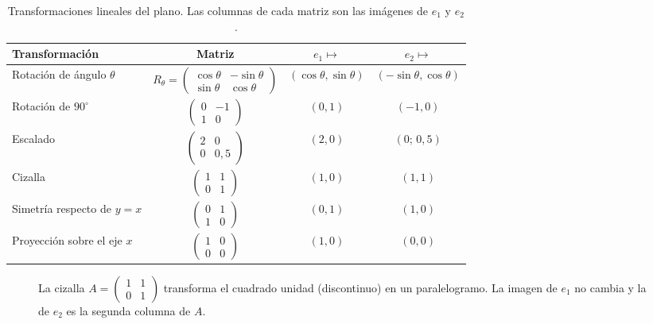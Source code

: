 \begin{table}[h]
\centering\small
\caption{Transformaciones lineales del plano. Las columnas de cada matriz son las imágenes de $e_1$ y $e_2$.}\label{tab:transformaciones}
\begin{tabular}{@{}lccc@{}}
\toprule
Transformación & Matriz & $e_1\mapsto$ & $e_2\mapsto$ \\
\midrule
Rotación de ángulo $\theta$ & $R_\theta=\begin{pmatrix}\cos\theta&-\sin\theta\\ \sin\theta&\cos\theta\end{pmatrix}$ & $(\cos\theta,\sin\theta)$ & $(-\sin\theta,\cos\theta)$ \\[10pt]
Rotación de $90^\circ$ & $\begin{pmatrix}0&-1\\1&0\end{pmatrix}$ & $(0,1)$ & $(-1,0)$ \\[8pt]
Escalado & $\begin{pmatrix}2&0\\0&0{,}5\end{pmatrix}$ & $(2,0)$ & $(0;\,0{,}5)$ \\[8pt]
Cizalla & $\begin{pmatrix}1&1\\0&1\end{pmatrix}$ & $(1,0)$ & $(1,1)$ \\[8pt]
Simetría respecto de $y=x$ & $\begin{pmatrix}0&1\\1&0\end{pmatrix}$ & $(0,1)$ & $(1,0)$ \\[8pt]
Proyección sobre el eje $x$ & $\begin{pmatrix}1&0\\0&0\end{pmatrix}$ & $(1,0)$ & $(0,0)$ \\
\bottomrule
\end{tabular}
\end{table}

\begin{figure}[h]
\centering
{}
\caption{La cizalla $A=\begin{pmatrix}1&1\\0&1\end{pmatrix}$ transforma el cuadrado unidad (discontinuo) en un paralelogramo. La imagen de $e_1$ no cambia y la de $e_2$ es la segunda columna de $A$.}
\label{fig:cizalla}
\end{figure}

